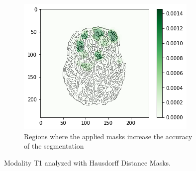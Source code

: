 \begin{figure}[H]
    \begin{subfigure}[t]{.45\textwidth}
        \centering
        \includegraphics[width=\linewidth]{chapters/06_hdm/c_Brats18_2013_17_1_L1/44.png}
        \caption{Regions where the applied masks increase the accuracy of the segmentation}
    \end{subfigure}
    \caption{Modality T1 analyzed with Hausdorff Distance Masks.}
    \label{brats_201317_t1}
\end{figure}

